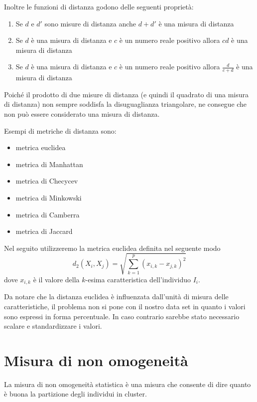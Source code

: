 \documentclass[]{book}
\providecommand{\tightlist}{%
  \setlength{\itemsep}{0pt}\setlength{\parskip}{0pt}}
\begin{document}
Inoltre le funzioni di distanza godono delle seguenti proprietà:

\begin{enumerate}
\def\labelenumi{\arabic{enumi}.}
\tightlist
\item
  Se \(d\) e \(d'\) sono misure di distanza anche \(d + d'\) è una
  misura di distanza
\item
  Se \(d\) è una misura di distanza e \(c\) è un numero reale positivo
  allora \(cd\) è una misura di distanza
\item
  Se \(d\) è una misura di distanza e \(c\) è un numero reale positivo
  allora \(\frac{d}{c+d}\) è una misura di distanza
\end{enumerate}

Poiché il prodotto di due misure di distanza (e quindi il quadrato di
una misura di distanza) non sempre soddisfa la disuguaglianza
triangolare, ne consegue che non può essere considerato una misura di
distanza.

Esempi di metriche di distanza sono:

\begin{itemize}
\tightlist
\item
  metrica euclidea
\item
  metrica di Manhattan
\item
  metrica di Checycev
\item
  metrica di Minkowski
\item
  metrica di Camberra
\item
  metrica di Jaccard
\end{itemize}

Nel seguito utilizzeremo la metrica euclidea definita nel seguente modo
\[d_2(X_i, X_j) = \sqrt{\sum_{k=1}^p(x_{i,k}-x_{j,k})^2}\] dove
\(x_{i,k}\) è il valore della \(k\)-esima caratteristica dell'individuo
\(I_i\).

Da notare che la distanza euclidea è influenzata dall'unità di misura
delle caratteristiche, il problema non si pone con il nostro data set in
quanto i valori sono espressi in forma percentuale. In caso contrario
sarebbe stato necessario scalare e standardizzare i valori.

\section{Misura di non omogeneità}\label{misura-di-non-omogeneita}

La misura di non omogeneità statistica è una misura che consente di dire
quanto è buona la partizione degli individui in cluster.
\end{document}
